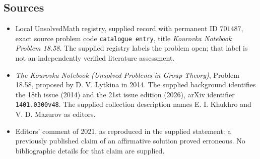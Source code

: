 \documentclass[11pt]{article}
\begin{document}
\subsection{Sources}
\begin{itemize}
\item Local UnsolvedMath registry, supplied record with permanent ID \(701487\), exact source problem code \texttt{catalogue entry}, title \emph{Kourovka Notebook Problem 18.58}. The supplied registry labels the problem open; that label is not an independently verified literature assessment.
\item \emph{The Kourovka Notebook (Unsolved Problems in Group Theory)}, Problem 18.58, proposed by D. V. Lytkina in 2014. The supplied background identifies the 18th issue (2014) and the 21st issue edition (2026), arXiv identifier \texttt{1401.0300v48}. The supplied collection description names E. I. Khukhro and V. D. Mazurov as editors.
\item Editors' comment of 2021, as reproduced in the supplied statement: a previously published claim of an affirmative solution proved erroneous. No bibliographic details for that claim are supplied.
\end{itemize}
\end{document}
